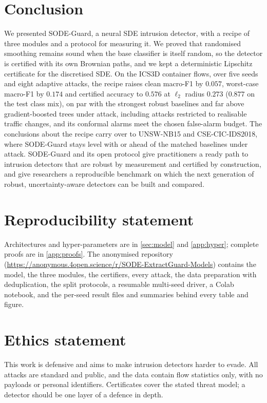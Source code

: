 \documentclass{article}
\newcommand{\anonrepo}{\url{https://anonymous.4open.science/r/SODE-ExtractGuard-Models}}
\theoremstyle{definition}
\begin{document}
\section{Conclusion}\label{sec:conc}
We presented SODE-Guard, a neural SDE intrusion detector, with a recipe of
three modules and a protocol for measuring it. We proved that randomised
smoothing remains sound when the base classifier is itself random, so the
detector is certified with its own Brownian paths, and we kept a deterministic
Lipschitz certificate for the discretised SDE. On the ICS3D container flows,
over five seeds and eight adaptive attacks, the recipe raises clean macro-F1 by $0.057$, worst-case
macro-F1 by $0.174$ and certified accuracy to $0.576$ at $\ell_2$ radius $0.273$
($0.877$ on the test class mix), on par with the strongest robust baselines and
far above gradient-boosted trees under attack, including attacks restricted to
realisable traffic changes, and its conformal alarms meet the chosen
false-alarm budget. The conclusions about the recipe carry over to UNSW-NB15 and
CSE-CIC-IDS2018, where SODE-Guard stays level with or ahead of the matched
baselines under attack. SODE-Guard and its open protocol
give practitioners a ready path to intrusion detectors that are robust by
measurement and certified by construction, and give researchers a reproducible
benchmark on which the next generation of robust, uncertainty-aware detectors
can be built and compared.

\section*{Reproducibility statement}
Architectures and hyper-parameters are in \cref{sec:model} and \cref{app:hyper};
complete proofs are in \cref{app:proofs}. The anonymised repository (\anonrepo)
contains the model, the three modules, the certifiers, every attack, the data
preparation with deduplication, the split protocols, a resumable multi-seed
driver, a Colab notebook, and the per-seed result files and summaries behind
every table and figure.

\section*{Ethics statement}
This work is defensive and aims to make intrusion detectors harder to evade. All
attacks are standard and public, and the data contain flow statistics only, with
no payloads or personal identifiers. Certificates cover the stated threat model;
a detector should be one layer of a defence in depth.
\end{document}
